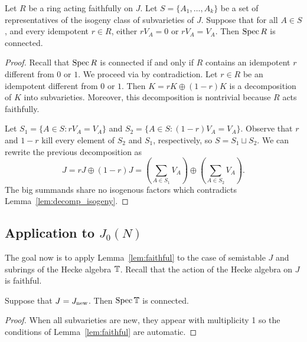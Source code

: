 \begin{lemma}
    \label{lem:faithful}
    Let $R$ be a ring acting faithfully on $J$. Let $S=\{A_1,\ldots,A_k\}$ be a
    set of representatives of the isogeny class of subvarieties of $J$. Suppose
    that for all $A\in S$, and every idempotent $r\in R$, either $rV_A=0$ or
    $rV_A=V_A$. Then $\operatorname{Spec} R$ is connected.
\end{lemma}
\begin{proof}
    Recall that $\operatorname{Spec} R$ is connected if and only if $R$ contains an
    idempotent $r$ different from $0$ or $1$. We proceed via by contradiction.
    Let $r\in R$ be an idempotent different from $0$ or $1$. Then $K = rK
    \oplus (1-r) K$ is a decomposition of $K$ into subvarieties. Moreover, this
    decomposition is nontrivial because $R$ acts faithfully.

    Let $S_1=\{A\in S:rV_A=V_A\}$ and $S_2=\{A\in S:(1-r)V_A=V_A\}$. Observe
    that $r$ and $1-r$ kill every element of $S_2$ and $S_1$, respectively, so
    $S=S_1\sqcup S_2$. We can rewrite the previous decomposition as
    \[
        J
        = rJ \oplus (1-r)J
        = \left(\sum_{A\in S_1} V_A \right)
        \oplus \left(\sum_{A\in S_2} V_A \right).
    \]
    The big summands share no isogenous factors which contradicts
    Lemma~\ref{lem:decomp_isogeny}.
\end{proof}

\subsection{Application to $J_0(N)$}

The goal now is to apply Lemma~\ref{lem:faithful} to the case of semistable
$J$ and subrings of the Hecke algebra $\mathbb{T}$. Recall that the action of the
Hecke algebra on $J$ is faithful.

\begin{proposition}\label{prop:new_jacobian_connected}
    Suppose that $J=J_{\operatorname{new}}$. Then $\operatorname{Spec}\mathbb{T}$ is connected.
\end{proposition}
\begin{proof}
    When all subvarieties are new, they appear with multiplicity 1 so the
    conditions of Lemma~\ref{lem:faithful} are automatic.
\end{proof}

